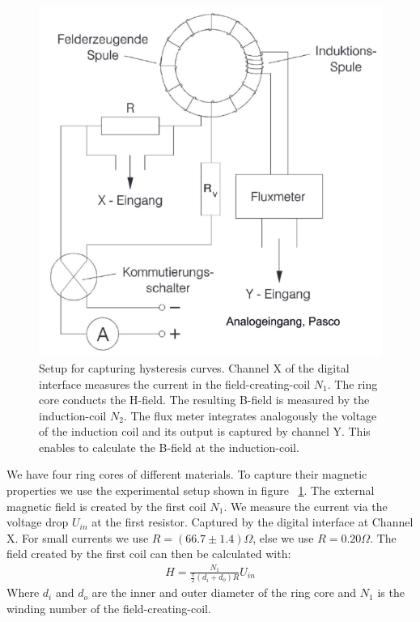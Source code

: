 \documentclass[a4paper,10pt,twocolumn]{article}
\begin{document}
    \begin{figure}[htbp]
        \includegraphics[width=0.9\linewidth]{ExperimentalSetup}
        \caption{Setup for capturing hysteresis curves.
        Channel X of the digital interface measures the current in the field-creating-coil $N_1$.
        The ring core conducts the H-field.
        The resulting B-field is measured by the induction-coil $N_2$.
        The flux meter integrates analogously the voltage of the induction coil and its output is captured by
        channel Y.
        This enables to calculate the B-field at the induction-coil.}
        \label{fig:ExperimentalSetup}
    \end{figure}
    
    We have four ring cores of different materials.
    To capture their magnetic properties we use the experimental setup shown in figure ~\ref{fig:ExperimentalSetup}. 
    The external magnetic field is created by the first coil $N_1$.
    We measure the current via the voltage drop $U_{in}$ at the first resistor.
    Captured by the digital interface at Channel X.
    For small currents we use $R = (66.7 \pm 1.4) \Omega$, else we use $R = 0.20 \Omega$.
    The field created by the first coil can then be calculated with:
    \begin{align}
        \label{eq:CalculateHField}
        H = \frac{N_1}{\frac{\pi}{2}(d_i + d_o)R}U_{in}
    \end{align}
    Where $d_i$ and $d_o$ are the inner and outer diameter of the ring core and $N_1$ is the winding number of the
    field-creating-coil.
    
\end{document}
